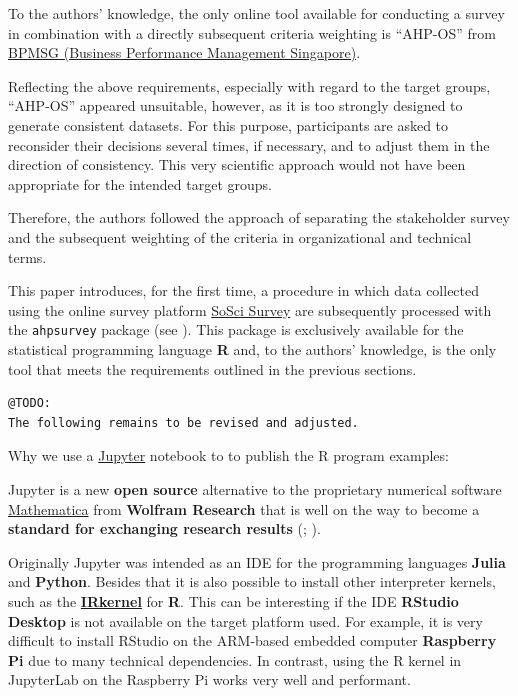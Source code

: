 \documentclass [oneside,10pt,a4paper,ngerman,BCOR10mm,headsepline,parindent,final]{scrartcl}
\begin{document}
To the authors' knowledge, the only online tool available for conducting
a survey in combination with a directly subsequent criteria weighting is
``AHP-OS'' from \href{https://bpmsg.com}{BPMSG (Business Performance
Management Singapore)}.

Reflecting the above requirements, especially with regard to the target
groups, ``AHP-OS'' appeared unsuitable, however, as it is too strongly
designed to generate consistent datasets. For this purpose, participants
are asked to reconsider their decisions several times, if necessary, and
to adjust them in the direction of consistency. This very scientific
approach would not have been appropriate for the intended target groups.

Therefore, the authors followed the approach of separating the
stakeholder survey and the subsequent weighting of the criteria in
organizational and technical terms.

This paper introduces, for the first time, a procedure in which data
collected using the online survey platform
\href{https://www.soscisurvey.de}{SoSci Survey} are subsequently
processed with the \texttt{ahpsurvey} package (see
\cite{Vignettes_ahpsurvey_2019}). This package is exclusively available
for the statistical programming language \textbf{R} and, to the authors'
knowledge, is the only tool that meets the requirements outlined in the
previous sections.

\begin{verbatim}
@TODO:
The following remains to be revised and adjusted.
\end{verbatim}

Why we use a
\href{https://en.wikipedia.org/wiki/Project_Jupyter}{Jupyter} notebook
to to publish the R program examples:

Jupyter is a new \textbf{open source} alternative to the proprietary
numerical software
\href{https://en.wikipedia.org/wiki/Wolfram_Mathematica}{Mathematica}
from \textbf{Wolfram Research} that is well on the way to become a
\textbf{standard for exchanging research results}
(\cite{Scientific_Paper_obsolete_2018};
\cite{Future_of_Research_Paper_2018}).

Originally Jupyter was intended as an IDE for the programming languages
\textbf{Julia} and \textbf{Python}. Besides that it is also possible to
install other interpreter kernels, such as the
\textbf{\href{https://irkernel.github.io/installation/}{IRkernel}} for
\textbf{R}. This can be interesting if the IDE \textbf{RStudio Desktop}
is not available on the target platform used. For example, it is very
difficult to install RStudio on the ARM-based embedded computer
\textbf{Raspberry Pi} due to many technical dependencies. In contrast,
using the R kernel in JupyterLab on the Raspberry Pi works very well and
performant.
\end{document}
